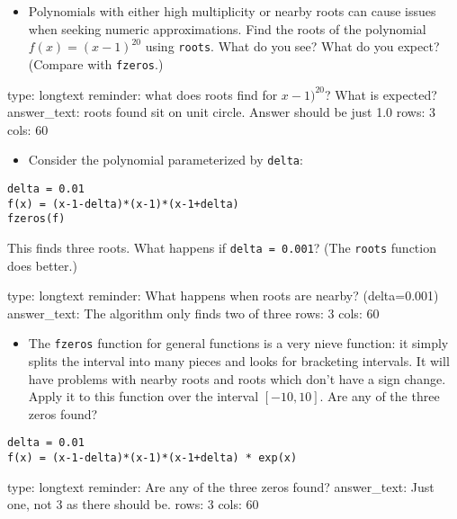 \documentclass[12pt]{article}
\begin{document}
\begin{itemize}
\itemsep1pt\parskip0pt
\item
  Polynomials with either high multiplicity or nearby roots can cause
  issues when seeking numeric approximations. Find the roots of the
  polynomial $f(x) = (x-1)^{20}$ using \texttt{roots}. What do you see?
  What do you expect? (Compare with \texttt{fzeros}.)
\end{itemize}

\begin{answer}
type: longtext
reminder: what does roots find for \( x-1)^20 \)? What is expected?
answer_text: roots found sit on unit circle. Answer should be just 1.0 
rows: 3
cols: 60
\end{answer}

\begin{itemize}
\itemsep1pt\parskip0pt
\item
  Consider the polynomial parameterized by \texttt{delta}:
\end{itemize}



\begin{verbatim}
delta = 0.01
f(x) = (x-1-delta)*(x-1)*(x-1+delta)
fzeros(f)
\end{verbatim}
This finds three roots. What happens if \texttt{delta = 0.001}? (The
\texttt{roots} function does better.)

\begin{answer}
type: longtext
reminder: What happens when roots are nearby? (delta=0.001)
answer_text: The algorithm only finds two of three 
rows: 3
cols: 60
\end{answer}

\begin{itemize}
\itemsep1pt\parskip0pt
\item
  The \texttt{fzeros} function for general functions is a very nieve
  function: it simply splits the interval into many pieces and looks for
  bracketing intervals. It will have problems with nearby roots and
  roots which don't have a sign change. Apply it to this function over
  the interval $[-10,10]$. Are any of the three zeros found?
\end{itemize}



\begin{verbatim}
delta = 0.01
f(x) = (x-1-delta)*(x-1)*(x-1+delta) * exp(x)
\end{verbatim}
\begin{answer}
type: longtext
reminder: Are any of the three zeros found?
answer_text: Just one, not 3 as there should be. 
rows: 3
cols: 60
\end{answer}
\end{document}
